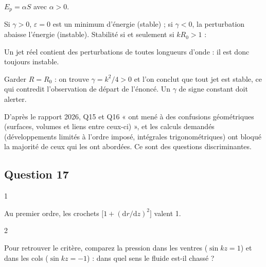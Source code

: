 \documentclass[11pt,a4paper]{article}
\newcommand{\equationajustee}[1]{%
  \sbox{\boiteequation}{$\displaystyle #1$}%
  \ifdim\wd\boiteequation>\linewidth
    \[\resizebox{\linewidth}{!}{\usebox{\boiteequation}}\]%
  \else
    \[#1\]%
  \fi}
\begin{document}
\equationajustee{\boxed{S=2\pi R_0\lambda(1+\gamma\varepsilon^2)}}

\equationajustee{\boxed{\gamma=\frac14\left(k^2-\frac1{R_0^2}\right)}}

\(E_p=\alpha S\) avec \(\alpha>0\).

Si \(\gamma>0\), \(\varepsilon=0\) est un minimum d'énergie (stable) ; si \(\gamma<0\), la perturbation abaisse l'énergie (instable). Stabilité si et seulement si \(kR_0>1\) :

\equationajustee{\boxed{\lambda<\lambda_\ell=2\pi R_0}}

Un jet réel contient des perturbations de toutes longueurs d'onde : il est donc toujours instable.

\begin{piege}

Garder \(R=R_0\) : on trouve \(\gamma=k^2/4>0\) et l'on conclut que tout jet est stable, ce qui contredit l'observation de départ de l'énoncé. Un \(\gamma\) de signe constant doit alerter.

\end{piege}

\begin{jury}

D'après le rapport 2026, Q15 et Q16 « ont mené à des confusions géométriques (surfaces, volumes et liens entre ceux-ci) », et les calculs demandés (développements limités à l'ordre imposé, intégrales trigonométriques) ont bloqué la majorité de ceux qui les ont abordées. Ce sont des questions discriminantes.

\end{jury}

\hypertarget{question-17}{%
\subsection{Question 17}\label{question-17}}

\begin{indication}{1}

Au premier ordre, les crochets \(\big[1+(\mathrm dr/\mathrm dz)^2\big]\) valent 1.

\end{indication}

\begin{indication}{2}

Pour retrouver le critère, comparez la pression dans les ventres (\(\sin kz=1\)) et dans les cols (\(\sin kz=-1\)) : dans quel sens le fluide est-il chassé ?

\end{indication}
\end{document}
